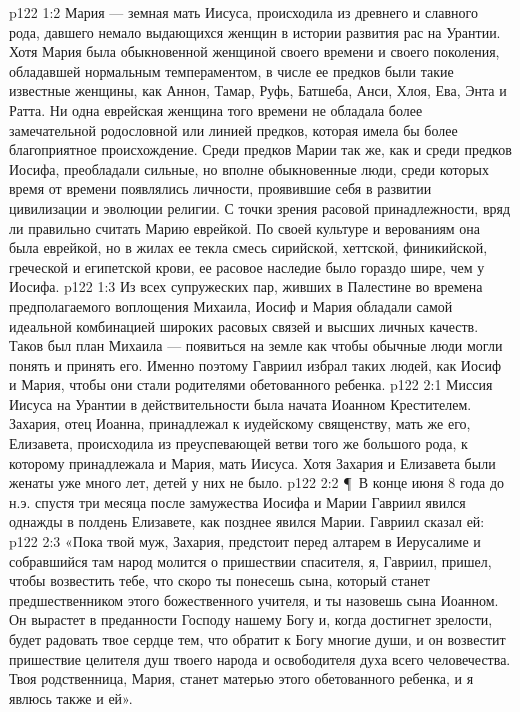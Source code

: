 \vs p122 1:2 Мария --- земная мать Иисуса, происходила из древнего и славного рода, давшего немало выдающихся женщин в истории развития рас на Урантии. Хотя Мария была обыкновенной женщиной своего времени и своего поколения, обладавшей нормальным темпераментом, в числе ее предков были такие известные женщины, как Аннон, Тамар, Руфь, Батшеба, Анси, Хлоя, Ева, Энта и Ратта. Ни одна еврейская женщина того времени не обладала более замечательной родословной или линией предков, которая имела бы более благоприятное происхождение. Среди предков Марии так же, как и среди предков Иосифа, преобладали сильные, но вполне обыкновенные люди, среди которых время от времени появлялись личности, проявившие себя в развитии цивилизации и эволюции религии. С точки зрения расовой принадлежности, вряд ли правильно считать Марию еврейкой. По своей культуре и верованиям она была еврейкой, но в жилах ее текла смесь сирийской, хеттской, финикийской, греческой и египетской крови, ее расовое наследие было гораздо шире, чем у Иосифа.
\vs p122 1:3 Из всех супружеских пар, живших в Палестине во времена предполагаемого воплощения Михаила, Иосиф и Мария обладали самой идеальной комбинацией широких расовых связей и высших личных качеств. Таков был план Михаила --- появиться на земле как  чтобы обычные люди могли понять и принять его. Именно поэтому Гавриил избрал таких людей, как Иосиф и Мария, чтобы они стали родителями обетованного ребенка.
\vs p122 2:1 Миссия Иисуса на Урантии в действительности была начата Иоанном Крестителем. Захария, отец Иоанна, принадлежал к иудейскому священству, мать же его, Елизавета, происходила из преуспевающей ветви того же большого рода, к которому принадлежала и Мария, мать Иисуса. Хотя Захария и Елизавета были женаты уже много лет, детей у них не было.
\vs p122 2:2 \P\ В конце июня 8 года до н.э. спустя три месяца после замужества Иосифа и Марии Гавриил явился однажды в полдень Елизавете, как позднее явился Марии. Гавриил сказал ей:
\vs p122 2:3 «Пока твой муж, Захария, предстоит перед алтарем в Иерусалиме и собравшийся там народ молится о пришествии спасителя, я, Гавриил, пришел, чтобы возвестить тебе, что скоро ты понесешь сына, который станет предшественником этого божественного учителя, и ты назовешь сына Иоанном. Он вырастет в преданности Господу нашему Богу и, когда достигнет зрелости, будет радовать твое сердце тем, что обратит к Богу многие души, и он возвестит пришествие целителя душ твоего народа и освободителя духа всего человечества. Твоя родственница, Мария, станет матерью этого обетованного ребенка, и я явлюсь также и ей».
